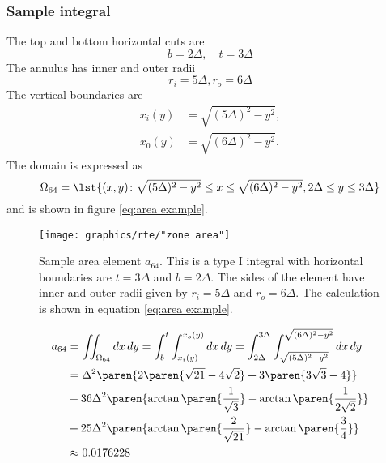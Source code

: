 \subsubsection{Sample integral}
%
The top and bottom horizontal cuts are
$$b = 2\Delta, \quad t = 3\Delta$$
The annulus has inner and outer radii
$$r_{i} = 5\Delta, r_{o} = 6\Delta$$
%
The vertical boundaries are
%
\begin{equation}
  \begin{split}
    x_{i}(y) &= \sqrt{ (5\Delta)^{2} - y^{2}}, \\
    x_{0}(y) &= \sqrt{ (6\Delta)^{2} - y^{2}}.
  \end{split}
\end{equation}
%
The domain is expressed as
%
\begin{equation}
  \Omega_{64} = \lst{(x,y)\colon \sqrt{ (5\Delta)^{2} - y^{2}} \le x \le \sqrt{ (6\Delta)^{2} - y^{2}}, 2\Delta \le y \le 3\Delta}
\end{equation}
%
and is shown in figure \eqref{eq:area example}.
\begin{figure}[htbp] 
   \centering
   \texttt{[image: graphics/rte/"zone area"]} 
   \caption[Sample area element]{Sample area element $a_{64}$. This is a type I integral with horizontal boundaries are $t = 3\Delta$ and $b = 2\Delta$. The sides of the element have inner and outer radii given by $r_{i} = 5\Delta$ and $r_{o} = 6\Delta$. The calculation is shown in equation \eqref{eq:area example}.}
   \label{fig:tooth}
\end{figure}
%
\begin{equation}
  \begin{split}
    a_{64}
      &= \iint_{\Omega_{64}}dx\,dy
       = \int_{b}^{t} \int_{x_{i}(y)}^{x_{o}(y)} dx\,dy
       = \int_{2\Delta}^{3\Delta} \int_{\sqrt{ (5\Delta)^{2} - y^{2}}}^{\sqrt{ (6\Delta)^{2} - y^{2}}} dx\,dy \\
      &= \Delta^{2} \paren{2 \paren{\sqrt{21} - 4\sqrt{2}} + 3 \paren{3\sqrt{3} - 4}} \\
      &+ 36\Delta^{2} \paren{ \arctan \paren{\frac{1}{\sqrt{3}}} - \arctan \paren{\frac{1}{2\sqrt{2}}} } \\
      &+ 25\Delta^{2} \paren{ \arctan \paren{\frac{2}{\sqrt{21}}} - \arctan \paren{\frac{3}{4}} } \\
      &\approx 0.0176228
      \label{eq:area example}
  \end{split}
\end{equation}

